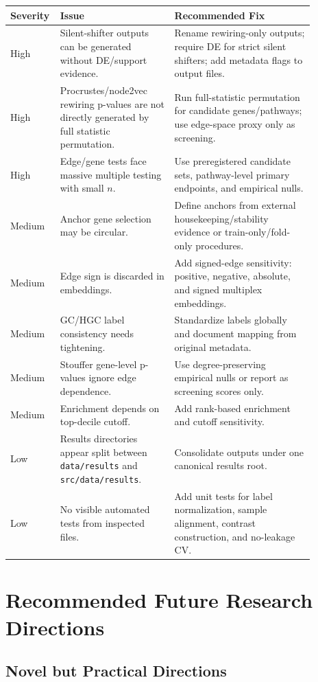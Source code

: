 \documentclass[11pt]{article}
\begin{document}
\begin{longtable}{p{0.08\linewidth} p{0.36\linewidth} p{0.44\linewidth}}
\toprule
\textbf{Severity} & \textbf{Issue} & \textbf{Recommended Fix} \\
\midrule
High & Silent-shifter outputs can be generated without DE/support evidence. & Rename rewiring-only outputs; require DE for strict silent shifters; add metadata flags to output files. \\
High & Procrustes/node2vec rewiring p-values are not directly generated by full statistic permutation. & Run full-statistic permutation for candidate genes/pathways; use edge-space proxy only as screening. \\
High & Edge/gene tests face massive multiple testing with small $n$. & Use preregistered candidate sets, pathway-level primary endpoints, and empirical nulls. \\
Medium & Anchor gene selection may be circular. & Define anchors from external housekeeping/stability evidence or train-only/fold-only procedures. \\
Medium & Edge sign is discarded in embeddings. & Add signed-edge sensitivity: positive, negative, absolute, and signed multiplex embeddings. \\
Medium & GC/HGC label consistency needs tightening. & Standardize labels globally and document mapping from original metadata. \\
Medium & Stouffer gene-level p-values ignore edge dependence. & Use degree-preserving empirical nulls or report as screening scores only. \\
Medium & Enrichment depends on top-decile cutoff. & Add rank-based enrichment and cutoff sensitivity. \\
Low & Results directories appear split between \texttt{data/results} and \texttt{src/data/results}. & Consolidate outputs under one canonical results root. \\
Low & No visible automated tests from inspected files. & Add unit tests for label normalization, sample alignment, contrast construction, and no-leakage CV. \\
\bottomrule
\end{longtable}

\section{Recommended Future Research Directions}

\subsection{Novel but Practical Directions}
\end{document}
